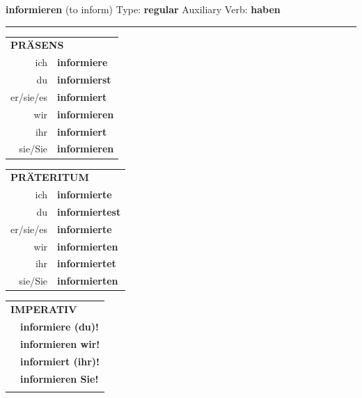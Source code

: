 \documentclass[10pt,a4paper]{revtex4-2}
\begin{document}
\begin{verbbox}
    {\Large \bf informieren} (to inform) \hfill Type: \textbf{regular} \hfill Auxiliary Verb: \textbf{haben} 
    
     \vspace{5pt}

    \hrule
    
    \vspace{5pt}

  \begin{tabular}{rl}
     \multicolumn{2}{l}{\textbf{PRÄSENS} }\\
    ich & \textbf{informiere}\\
    du & \textbf{informierst}\\
    er/sie/es & \textbf{informiert}\\
    wir & \textbf{informieren}\\
    ihr & \textbf{informiert}\\
    sie/Sie & \textbf{informieren}\\
  \end{tabular}
  \hfill
  \begin{tabular}{rl}
    \multicolumn{2}{l}{\textbf{PRÄTERITUM} }\\
    ich & \textbf{informierte}\\
    du & \textbf{informiertest}\\
    er/sie/es & \textbf{informierte}\\
    wir & \textbf{informierten}\\
    ihr & \textbf{informiertet}\\
    sie/Sie & \textbf{informierten}\\
  \end{tabular}
  \hfill
  \begin{tabular}{rl}
     \multicolumn{2}{l}{\textbf{IMPERATIV} }\\
   & \textbf{informiere (du)!}\\
   & \textbf{informieren wir!}\\
   & \textbf{informiert (ihr)!}\\
   & \textbf{informieren Sie!}\\
   & \vspace{10pt}
  \end{tabular}

 \vspace{10pt}


\end{verbbox}
\end{document}
